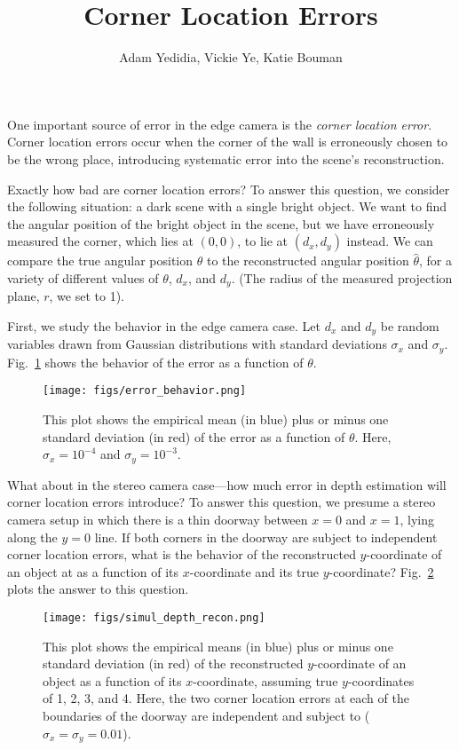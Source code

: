 \documentclass[11pt]{article}
\title{Corner Location Errors}
\author{Adam Yedidia, Vickie Ye, Katie Bouman}
\begin{document}
\maketitle

One important source of error in the edge camera is the \emph{corner location error}. Corner location errors occur when the corner of the wall is erroneously chosen to be the wrong place, introducing systematic error into the scene's reconstruction.

Exactly how bad are corner location errors? To answer this question, we consider the following situation: a dark scene with a single bright object. We want to find the angular position of the bright object in the scene, but we have erroneously measured the corner, which lies at $(0,0)$, to lie at $(d_x, d_y)$ instead. We can compare the true angular position $\theta$ to the reconstructed angular position $\hat{\theta}$, for a variety of different values of $\theta$, $d_x$, and $d_y$. (The radius of the measured projection plane, $r$, we set to 1).

First, we study the behavior in the edge camera case. Let $d_x$ and $d_y$ be random variables drawn from Gaussian distributions with standard deviations $\sigma_x$ and $\sigma_y$. Fig.~\ref{fig:error_behavior} shows the behavior of the error as a function of $\theta$.

\begin{figure}
\centering
\texttt{[image: figs/error\_behavior.png]}
\caption{This plot shows the empirical mean (in blue) plus or minus one standard deviation (in red) of the error as a function of $\theta$. Here, $\sigma_x = 10^{-4}$ and $\sigma_y = 10^{-3}$. \label{fig:error_behavior}}
\end{figure}

What about in the stereo camera case---how much error in depth estimation will corner location errors introduce? To answer this question, we presume a stereo camera setup in which there is a thin doorway between $x=0$ and $x=1$, lying along the $y=0$ line. If both corners in the doorway are subject to independent corner location errors, what is the behavior of the reconstructed $y$-coordinate of an object at as a function of its $x$-coordinate and its true $y$-coordinate? Fig.~\ref{fig:simul_depth_recon} plots the answer to this question.

\begin{figure}
\centering
\texttt{[image: figs/simul\_depth\_recon.png]}
\caption{This plot shows the empirical means (in blue) plus or minus one standard deviation (in red) of the reconstructed $y$-coordinate of an object as a function of its $x$-coordinate, assuming true $y$-coordinates of 1, 2, 3, and 4. Here, the two corner location errors at each of the boundaries of the doorway are independent and subject to ($\sigma_x = \sigma_y = 0.01$). \label{fig:simul_depth_recon}}
\end{figure}
\end{document}
